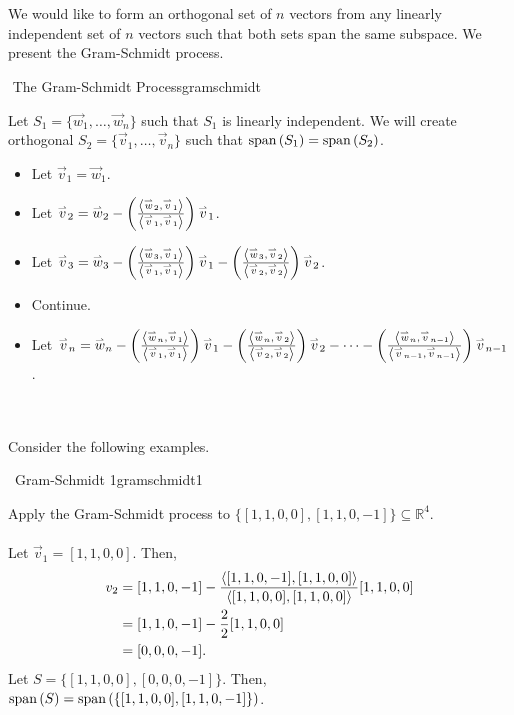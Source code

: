         \pagebreak
        \vphantom
        \\
        \\
        We would like to form an orthogonal set of \(n\) vectors from any linearly independent set of \(n\) vectors such that both sets span the same subspace. We present the Gram-Schmidt process.
        \begin{theorem}{\Stop\,\,The Gram-Schmidt Process}{gramschmidt}
            
            Let \(S_1=\{\vec{w}_1,\ldots,\vec{w}_n\}\) such that \(S_1\) is linearly independent. We will create orthogonal \(S_2=\{\vec{v}_1,\ldots,\vec{v}_n\}\) such that \(\Span(S_1)=\Span(S_2)\).
            \begin{itemize}
                \item Let \(\vec{v}_1=\vec{w}_1\).
                \item Let \(\vec{v}_2=\vec{w}_2-\left(\frac{\iprod{\vec{w}_2}{\vec{v}_1}}{\iprod{\vec{v}_1}{\vec{v}_1}}\right)\vec{v}_1\).
                \item Let \(\vec{v}_3=\vec{w}_3-\left(\frac{\iprod{\vec{w}_3}{\vec{v}_1}}{\iprod{\vec{v}_1}{\vec{v}_1}}\right)\vec{v}_1-\left(\frac{\iprod{\vec{w}_3}{\vec{v}_2}}{\iprod{\vec{v}_2}{\vec{v}_2}}\right)\vec{v}_2\).
                \item Continue.
                \item Let \(\vec{v}_n=\vec{w}_n-\left(\frac{\iprod{\vec{w}_n}{\vec{v}_1}}{\iprod{\vec{v}_1}{\vec{v}_1}}\right)\vec{v}_1-\left(\frac{\iprod{\vec{w}_n}{\vec{v}_2}}{\iprod{\vec{v}_2}{\vec{v}_2}}\right)\vec{v}_2-\cdots-\left(\frac{\iprod{\vec{w}_n}{\vec{v}_{n-1}}}{\iprod{\vec{v}_{n-1}}{\vec{v}_{n-1}}}\right)\vec{v}_{n-1}\).
            \end{itemize}

        \end{theorem}
        \vphantom
        \\
        \\
        Consider the following examples.
        \begin{example}{\Difficulty\,\Difficulty\,\,Gram-Schmidt 1}{gramschmidt1}

            Apply the Gram-Schmidt process to \(\{[1,1,0,0],[1,1,0,-1]\}\subseteq\mathbb{R}^4\).
            \\
            \\
            Let \(\vec{v}_1=[1,1,0,0]\). Then,
            \begin{align*}
                v_2&=[1,1,0,-1]-\frac{\iprod{[1,1,0,-1]}{[1,1,0,0]}}{\iprod{[1,1,0,0]}{[1,1,0,0]}}[1,1,0,0] \\
                &=[1,1,0,-1]-\frac{2}{2}[1,1,0,0] \\
                &=[0,0,0,-1].
            \end{align*}
            Let \(S=\{[1,1,0,0],[0,0,0,-1]\}\). Then, \(\Span(S)=\Span(\{[1,1,0,0],[1,1,0,-1]\})\).
            
        \end{example}
